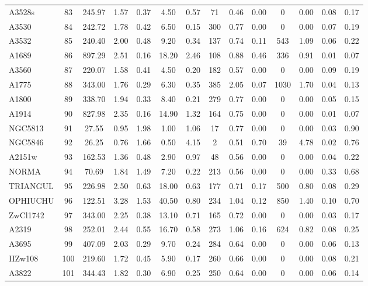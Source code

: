 \documentclass[10pt,aps,pra,reprint,amsmath,amsfonts,amssymb,showpacs,nofootinbib,floatfix]{revtex4-1}
\newcommand{\vst}{\vspace{-0.14mm}}
\begin{document}
{\begin{table}
\begin{minipage}{2.0\columnwidth}
\begin{tabular}{l c c c c c c c c c c c c c}
A3528s & 83 & 245.97 & 1.57 & 0.37 & 4.50 & 0.57 & 71 & 0.46 & 0.00 & 0 & 0.00 & 0.08 & 0.17 \vst \\
A3530 & 84 & 242.72 & 1.78 & 0.42 & 6.50 & 0.15 & 300 & 0.77 & 0.00 & 0 & 0.00 & 0.07 & 0.19 \vst \\
A3532 & 85 & 240.40 & 2.00 & 0.48 & 9.20 & 0.34 & 137 & 0.74 & 0.11 & 543 & 1.09 & 0.06 & 0.22 \vst \\
A1689 & 86 & 897.29 & 2.51 & 0.16 & 18.20 & 2.46 & 108 & 0.88 & 0.46 & 336 & 0.91 & 0.01 & 0.07 \vst \\
A3560 & 87 & 220.07 & 1.58 & 0.41 & 4.50 & 0.20 & 182 & 0.57 & 0.00 & 0 & 0.00 & 0.09 & 0.19 \vst \\
A1775 & 88 & 343.00 & 1.76 & 0.29 & 6.30 & 0.35 & 385 & 2.05 & 0.07 & 1030 & 1.70 & 0.04 & 0.13 \vst \\
A1800 & 89 & 338.70 & 1.94 & 0.33 & 8.40 & 0.21 & 279 & 0.77 & 0.00 & 0 & 0.00 & 0.05 & 0.15 \vst \\
A1914 & 90 & 827.98 & 2.35 & 0.16 & 14.90 & 1.32 & 164 & 0.75 & 0.00 & 0 & 0.00 & 0.01 & 0.07 \vst \\
NGC5813 & 91 & 27.55 & 0.95 & 1.98 & 1.00 & 1.06 & 17 & 0.77 & 0.00 & 0 & 0.00 & 0.03 & 0.90 \vst \\
NGC5846 & 92 & 26.25 & 0.76 & 1.66 & 0.50 & 4.15 & 2 & 0.51 & 0.70 & 39 & 4.78 & 0.02 & 0.76 \vst \\
A2151w & 93 & 162.53 & 1.36 & 0.48 & 2.90 & 0.97 & 48 & 0.56 & 0.00 & 0 & 0.00 & 0.04 & 0.22 \vst \\
NORMA & 94 & 70.69 & 1.84 & 1.49 & 7.20 & 0.22 & 213 & 0.56 & 0.00 & 0 & 0.00 & 0.33 & 0.68 \vst \\
TRIANGUL & 95 & 226.98 & 2.50 & 0.63 & 18.00 & 0.63 & 177 & 0.71 & 0.17 & 500 & 0.80 & 0.08 & 0.29 \vst \\
OPHIUCHU & 96 & 122.51 & 3.28 & 1.53 & 40.50 & 0.80 & 234 & 1.04 & 0.12 & 850 & 1.40 & 0.10 & 0.70 \vst \\
ZwCl1742 & 97 & 343.00 & 2.25 & 0.38 & 13.10 & 0.71 & 165 & 0.72 & 0.00 & 0 & 0.00 & 0.03 & 0.17 \vst \\
A2319 & 98 & 252.01 & 2.44 & 0.55 & 16.70 & 0.58 & 273 & 1.06 & 0.16 & 624 & 0.82 & 0.08 & 0.25 \vst \\
A3695 & 99 & 407.09 & 2.03 & 0.29 & 9.70 & 0.24 & 284 & 0.64 & 0.00 & 0 & 0.00 & 0.06 & 0.13 \vst \\
IIZw108 & 100 & 219.60 & 1.72 & 0.45 & 5.90 & 0.17 & 260 & 0.66 & 0.00 & 0 & 0.00 & 0.08 & 0.21 \vst \\
A3822 & 101 & 344.43 & 1.82 & 0.30 & 6.90 & 0.25 & 250 & 0.64 & 0.00 & 0 & 0.00 & 0.06 & 0.14 \vst \\

\end{tabular}
\end{minipage}
\end{table}}
\end{document}
